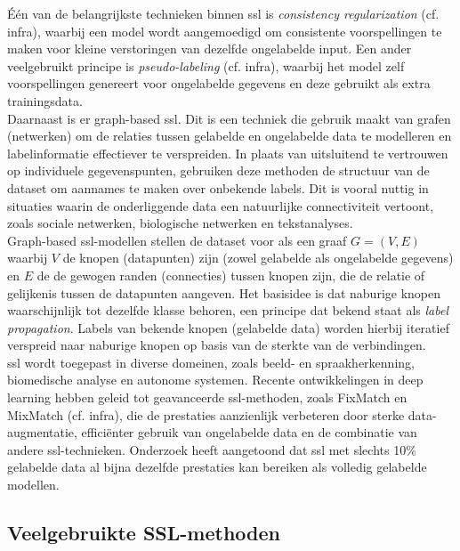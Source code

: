 Één van de belangrijkste technieken binnen \gls{ssl} is \emph{consistency regularization} (cf. infra), waarbij een model wordt aangemoedigd om consistente voorspellingen te maken voor kleine verstoringen van dezelfde ongelabelde input. \autocite{Fan_2022} Een ander veelgebruikt principe is \emph{pseudo-labeling} (cf. infra), waarbij het model zelf voorspellingen genereert voor ongelabelde gegevens en deze gebruikt als extra trainingsdata. \autocite{Lee_2013} \\

Daarnaast is er graph-based \gls{ssl}. Dit is een techniek die gebruik maakt van grafen (netwerken) om de relaties tussen gelabelde en ongelabelde data te modelleren en labelinformatie effectiever te verspreiden. In plaats van uitsluitend te vertrouwen op individuele gegevenspunten, gebruiken deze methoden de structuur van de dataset om aannames te maken over onbekende labels. Dit is vooral nuttig in situaties waarin de onderliggende data een natuurlijke connectiviteit vertoont, zoals sociale netwerken, biologische netwerken en tekstanalyses. \autocite{Song_2021} \\

Graph-based \gls{ssl}-modellen stellen de dataset voor als een graaf $G = (V, E)$ waarbij $V$ de knopen (datapunten) zijn (zowel gelabelde als ongelabelde gegevens) en $E$ de de gewogen randen (connecties) tussen knopen zijn, die de relatie of gelijkenis tussen de datapunten aangeven. Het basisidee is dat naburige knopen waarschijnlijk tot dezelfde klasse behoren, een principe dat bekend staat als \emph{label propagation}. Labels van bekende knopen (gelabelde data) worden hierbij iteratief verspreid naar naburige knopen op basis van de sterkte van de verbindingen. \autocite{Zhu_2005} \\

\gls{ssl} wordt toegepast in diverse domeinen, zoals beeld- en spraakherkenning, biomedische analyse en autonome systemen. Recente ontwikkelingen in deep learning hebben geleid tot geavanceerde \gls{ssl}-methoden, zoals FixMatch en MixMatch (cf. infra), die de prestaties aanzienlijk verbeteren door sterke data-augmentatie, efficiënter gebruik van ongelabelde data en de combinatie van andere \gls{ssl}-technieken. Onderzoek heeft aangetoond dat \gls{ssl} met slechts 10\% gelabelde data al bijna dezelfde prestaties kan bereiken als volledig gelabelde modellen. \autocite{Lucas_2022}

\subsection{Veelgebruikte SSL-methoden}

